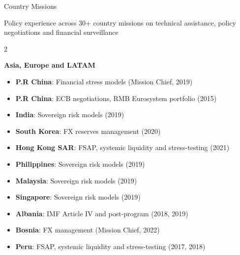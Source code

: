 \documentclass[usegeometry, 10pt, a4paper]{cv} %
\begin{document}
\begin{rubriquetableau}[0.95\textwidth]{Country Missions}

Policy experience across 30+ country missions on technical assistance, policy negotiations and financial surveillance\\

\begin{multicols}{2}

\textbf{\large Asia, Europe and LATAM}
\begin{itemize}
  \item \textbf{P.R China}: Financial stress models (Mission Chief, 2019) 
  \item \textbf{P.R China}: ECB negotiations, RMB Eurosystem portfolio (2015)
  \item \textbf{India}: Sovereign risk models (2019)
  \item \textbf{South Korea}: FX reserves management (2020)
  \item \textbf{Hong Kong SAR}: FSAP, systemic liquidity and stress-testing (2021)
  \item \textbf{Philippines}: Sovereign risk models (2019)
  \item \textbf{Malaysia}: Sovereign risk models (2019)
  \item \textbf{Singapore}: Sovereign risk models (2019)
  \item \textbf{Albania}: IMF Article IV and post-program (2018, 2019)
  \item \textbf{Bosnia}: FX management (Mission Chief, 2022)
  \item \textbf{Peru}: FSAP, systemic liquidity and stress-testing (2017, 2018)
\end{itemize}


\end{multicols}
\end{rubriquetableau}
\end{document}
